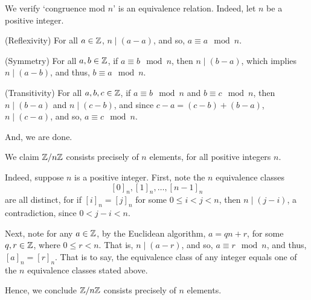 \begin{xca}
\end{xca}

\begin{xca}
\end{xca}

\begin{xca}
\end{xca}

\begin{xca}
\end{xca}

\begin{xca}
\end{xca}

\begin{xca}
We verify `congruence mod $n$' is an equivalence relation. Indeed, let $n$ be a
positive integer.

(Reflexivity) For all $a \in \mathbb{Z}$, $n \mid (a - a)$, and so, $a \equiv a \mod n$.

(Symmetry) For all $a, b \in \mathbb{Z}$, if $a \equiv b \mod n$, then $n \mid (b - a)$,
which implies $n \mid (a - b)$, and thus, $b \equiv a \mod n$.

(Transitivity) For all $a, b, c \in \mathbb{Z}$, if $a \equiv b \mod n$ and $b \equiv c
\mod n$, then $n \mid (b - a)$ and $n \mid (c - b)$, and since $c - a = (c - b)
+ (b - a)$, $n \mid (c - a)$, and so, $a \equiv c \mod n$.

And, we are done.
\end{xca}

\begin{xca}
We claim $\mathbb{Z}/{n\mathbb{Z}}$ consists precisely of $n$ elements, for all positive
integers $n$.

Indeed, suppose $n$ is a positive integer. First, note the $n$ equivalence
classes \[ [0]_n, [1]_n, \ldots, [n-1]_n \] are all distinct, for if $[i]_n =
[j]_n$ for some $0 \le i < j < n$, then $n \mid (j-i)$, a contradiction, since
$0 < j-i < n$.

Next, note for any $a \in \mathbb{Z}$, by the Euclidean algorithm, $a = qn + r$, for
some $q, r \in \mathbb{Z}$, where $0 \le r < n$. That is, $n \mid (a-r)$, and so,
$a \equiv r \mod n$, and thus, $[a]_n = [r]_n$. That is to say, the equivalence
class of any integer equals one of the $n$ equivalence classes stated above.

Hence, we conclude $\mathbb{Z}/{n\mathbb{Z}}$ consists precisely of $n$ elements.
\end{xca}

